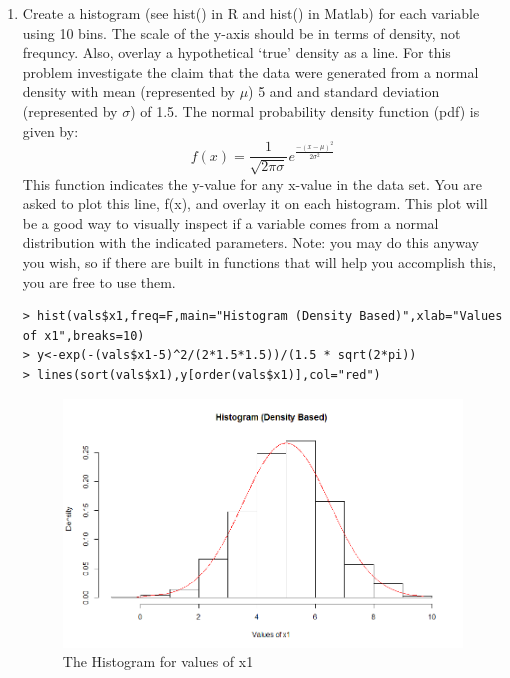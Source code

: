 \documentclass[fontsize=10pt]{scrartcl}
\begin{document}
\begin{enumerate}
		\item
		Create a histogram (see hist() in R and hist() in Matlab) for each variable using 10 bins. The scale of the y-axis should be in terms of density, not frequncy. Also, overlay a hypothetical ‘true’ density as a line. For this problem investigate the claim that the data were generated from a normal density with mean (represented by $\mu$) 5 and and standard deviation (represented by $\sigma$) of 1.5. The normal probability density function (pdf) is given by: \\
		\begin{equation*}
			f(x) = \frac{1}{\sqrt{2\pi\sigma}}e^{\frac{-(x-\mu)^2}{2\sigma^2}}
		\end{equation*}
		This function indicates the y-value for any x-value in the data set. You are asked to plot this line, f(x), and overlay it on each histogram. This plot will be a good way to visually inspect if a variable comes from a normal distribution with the indicated parameters. Note: you may do this anyway you wish, so if there are built in functions that will help you accomplish this, you are free to use them. \\
\begin{verbatim}
> hist(vals$x1,freq=F,main="Histogram (Density Based)",xlab="Values of x1",breaks=10)
> y<-exp(-(vals$x1-5)^2/(2*1.5*1.5))/(1.5 * sqrt(2*pi))
> lines(sort(vals$x1),y[order(vals$x1)],col="red")
\end{verbatim}
		\begin{figure}[H]
			\begin{center}
				\includegraphics[scale=.5]{resources/histogram_q3.png}
				\caption{The Histogram for values of x1}
			\end{center}
		\end{figure}


\end{enumerate}
\end{document}
